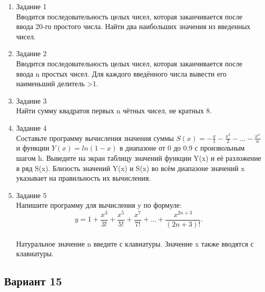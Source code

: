 \documentclass[a4paper]{article}
\begin{document}
	
	\begin{enumerate} 
		\item Задание 1 \\
		Вводится последовательность целых чисел, которая заканчивается после ввода 20-го простого числа. Найти два наибольших значения из введенных чисел.\\
		\item Задание 2\\
		Вводится последовательность целых чисел, которая заканчивается после ввода n простых чисел. Для каждого введённого числа вывести его наименьший делитель >1.\\
		\item Задание 3 \\
		Найти сумму квадратов первых n чётных чисел, не кратных 8.\\
		\item Задание 4 \\ 
		Составьте программу вычисления значения суммы  $S(x)=-\frac{x}{1}-\frac{x^2}{2}-...-\frac{x^n}{n}$
		и функции $Y(x)=ln(1-x)$ в диапазоне от 0 до 0.9
		с произвольным шагом h. Выведите на экран таблицу значений функции Y(x) и её разложение в ряд S(x). Близость значений Y(x) и S(x) во всём диапазоне
		значений x указывает на правильность их вычисления.\\
		\item Задание 5 \\
		Напишите программу для вычисления y по формуле:\\
		$$y=1+\frac{x^3}{3!}+\frac{x^5}{5!}+\frac{x^7}{7!}+...+\frac{x^{2n+3}}{(2n+3)!}.$$\\
		Натуральное значение n введите с клавиатуры. Значение x также вводятся с клавиатуры.\\
		
	\end{enumerate}
	
	\begin{center}
		\subsection*{Вариант 15}
	\end{center}
	
\end{document}
